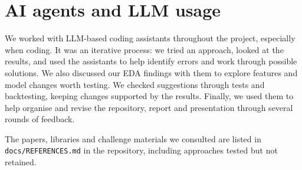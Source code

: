 \documentclass[10pt,a4paper]{article}
\begin{document}
\section{AI agents and LLM usage}
We worked with LLM-based coding assistants throughout the project, especially when coding. It was an iterative process: we tried an approach, looked at the results, and used the assistants to help identify errors and work through possible solutions. We also discussed our EDA findings with them to explore features and model changes worth testing. We checked suggestions through tests and backtesting, keeping changes supported by the results. Finally, we used them to help organise and revise the repository, report and presentation through several rounds of feedback.

{\small The papers, libraries and challenge materials we consulted are listed in \texttt{docs/REFERENCES.md} in the repository, including approaches tested but not retained.}
\end{document}
